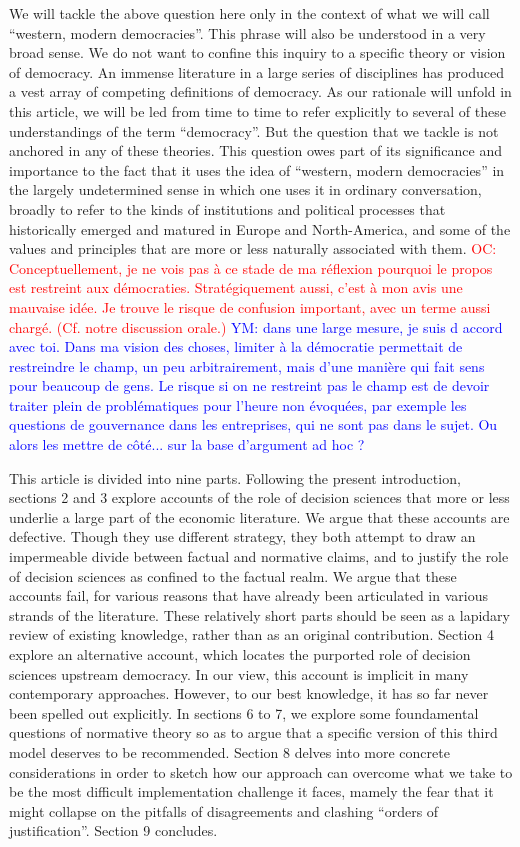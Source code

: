 \documentclass[preprint, french, english, 11pt]{elsarticle}%
\newcommand{\commentYM}[1]{\textcolor{blue}{YM: #1}}
\newcommand{\commentOC}[1]{\textcolor{red}{OC: #1}}
\begin{document}
We will tackle the above question here only in the context of what we will call ``western, modern democracies''. This phrase will also be understood in a very broad sense. We do not want to confine this inquiry to a specific theory or vision of democracy. An immense literature in a large series of disciplines has produced a vest array of competing definitions of democracy. As our rationale will unfold in this article, we will be led from time to time to refer explicitly to several of these understandings of the term ``democracy''. But the question that we tackle is not anchored in any of these theories. This question owes part of its significance and importance to the fact that it uses the idea of “western, modern democracies” in the largely undetermined sense in which one uses it in ordinary conversation, broadly to refer to the kinds of institutions and political processes that historically emerged and matured in Europe and North-America, and some of the values and principles that are more or less naturally associated with them.
\commentOC{Conceptuellement, je ne vois pas à ce stade de ma réflexion pourquoi le propos est restreint aux démocraties. Stratégiquement aussi, c’est à mon avis une mauvaise idée. Je trouve le risque de confusion important, avec un terme aussi chargé. (Cf. notre discussion orale.)}
\commentYM{dans une large mesure, je suis d accord avec toi. Dans ma vision des choses, limiter à la démocratie permettait de restreindre le champ, un peu arbitrairement, mais d'une manière qui fait sens pour beaucoup de gens. Le risque si on ne restreint pas le champ est de devoir traiter plein de problématiques pour l'heure non évoquées, par exemple les questions de gouvernance dans les entreprises, qui ne sont pas dans le sujet. Ou alors les mettre de côté... sur la base d'argument ad hoc ?}

This article is divided into nine parts. Following the present introduction, sections 2 and 3 explore accounts of the role of decision sciences that more or less underlie a large part of the economic literature. We argue that these accounts are defective. Though they use different strategy, they both attempt to draw an impermeable divide between factual and normative claims, and to justify the role of decision sciences as confined to the factual realm. We argue that these accounts fail, for various reasons that have already been articulated in various strands of the literature. These relatively short parts should be seen as a lapidary review of existing knowledge, rather than as an original contribution. Section 4 explore an alternative account, which locates the purported role of decision sciences upstream democracy. In our view, this account is implicit in many contemporary approaches. However, to our best knowledge, it has so far never been spelled out explicitly. In sections 6 to 7, we explore some foundamental questions of normative theory so as to argue that a specific version of this third model deserves to be recommended. Section 8 delves into more concrete considerations in order to sketch how our approach can overcome what we take to be the most difficult implementation challenge it faces, mamely the fear that it might collapse on the pitfalls of disagreements and clashing ``orders of justification''. Section 9 concludes.
\end{document}
